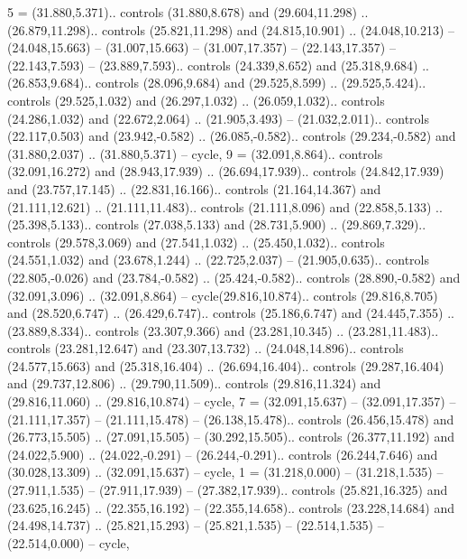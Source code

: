 {5} = {(31.880,5.371).. controls (31.880,8.678) and (29.604,11.298) .. (26.879,11.298).. controls (25.821,11.298) and (24.815,10.901) .. (24.048,10.213) -- (24.048,15.663) -- (31.007,15.663) -- (31.007,17.357) -- (22.143,17.357) -- (22.143,7.593) -- (23.889,7.593).. controls (24.339,8.652) and (25.318,9.684) .. (26.853,9.684).. controls (28.096,9.684) and (29.525,8.599) .. (29.525,5.424).. controls (29.525,1.032) and (26.297,1.032) .. (26.059,1.032).. controls (24.286,1.032) and (22.672,2.064) .. (21.905,3.493) -- (21.032,2.011).. controls (22.117,0.503) and (23.942,-0.582) .. (26.085,-0.582).. controls (29.234,-0.582) and (31.880,2.037) .. (31.880,5.371) -- cycle},
{9} = {(32.091,8.864).. controls (32.091,16.272) and (28.943,17.939) .. (26.694,17.939).. controls (24.842,17.939) and (23.757,17.145) .. (22.831,16.166).. controls (21.164,14.367) and (21.111,12.621) .. (21.111,11.483).. controls (21.111,8.096) and (22.858,5.133) .. (25.398,5.133).. controls (27.038,5.133) and (28.731,5.900) .. (29.869,7.329).. controls (29.578,3.069) and (27.541,1.032) .. (25.450,1.032).. controls (24.551,1.032) and (23.678,1.244) .. (22.725,2.037) -- (21.905,0.635).. controls (22.805,-0.026) and (23.784,-0.582) .. (25.424,-0.582).. controls (28.890,-0.582) and (32.091,3.096) .. (32.091,8.864) -- cycle(29.816,10.874).. controls (29.816,8.705) and (28.520,6.747) .. (26.429,6.747).. controls (25.186,6.747) and (24.445,7.355) .. (23.889,8.334).. controls (23.307,9.366) and (23.281,10.345) .. (23.281,11.483).. controls (23.281,12.647) and (23.307,13.732) .. (24.048,14.896).. controls (24.577,15.663) and (25.318,16.404) .. (26.694,16.404).. controls (29.287,16.404) and (29.737,12.806) .. (29.790,11.509).. controls (29.816,11.324) and (29.816,11.060) .. (29.816,10.874) -- cycle},
{7} = {(32.091,15.637) -- (32.091,17.357) -- (21.111,17.357) -- (21.111,15.478) -- (26.138,15.478).. controls (26.456,15.478) and (26.773,15.505) .. (27.091,15.505) -- (30.292,15.505).. controls (26.377,11.192) and (24.022,5.900) .. (24.022,-0.291) -- (26.244,-0.291).. controls (26.244,7.646) and (30.028,13.309) .. (32.091,15.637) -- cycle},
{1} = {(31.218,0.000) -- (31.218,1.535) -- (27.911,1.535) -- (27.911,17.939) -- (27.382,17.939).. controls (25.821,16.325) and (23.625,16.245) .. (22.355,16.192) -- (22.355,14.658).. controls (23.228,14.684) and (24.498,14.737) .. (25.821,15.293) -- (25.821,1.535) -- (22.514,1.535) -- (22.514,0.000) -- cycle},
